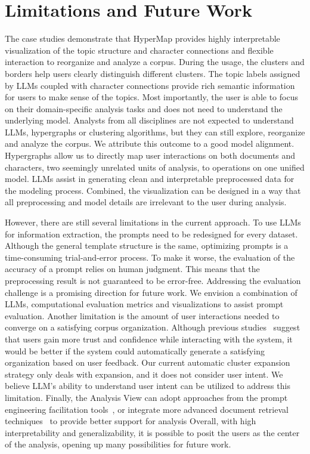 \section{Limitations and Future Work}
The case studies demonstrate that HyperMap provides highly interpretable visualization of the topic structure and character connections and flexible interaction to reorganize and analyze a corpus.
During the usage, the clusters and borders help users clearly distinguish different clusters.
The topic labels assigned by LLMs coupled with character connections provide rich semantic information for users to make sense of the topics.
Most importantly, the user is able to focus on their domain-specific analysis tasks and does not need to understand the underlying model. 
Analysts from all disciplines are not expected to understand LLMs, hypergraphs or clustering algorithms, but they can still explore, reorganize and analyze the corpus. 
We attribute this outcome to a good model alignment. 
Hypergraphs allow us to directly map user interactions on both documents and characters, two seemingly unrelated units of analysis, to operations on one unified model. 
LLMs assist in generating clean and interpretable preprocessed data for the modeling process.
Combined, the visualization can be designed in a way that all preprocessing and model details are irrelevant to the user during analysis.

However, there are still several limitations in the current approach.
To use LLMs for information extraction, the prompts need to be redesigned for every dataset.
Although the general template structure is the same, optimizing prompts is a time-consuming trial-and-error process.
To make it worse, the evaluation of the accuracy of a prompt relies on human judgment.
This means that the preprocessing result is not guaranteed to be error-free.
Addressing the evaluation challenge is a promising direction for future work.
We envision a combination of LLMs, computational evaluation metrics and visualizations to assist prompt evaluation. 
Another limitation is the amount of user interactions needed to converge on a satisfying corpus organization.
Although previous studies~\cite{bach2022systematic} suggest that users gain more trust and confidence while interacting with the system, 
it would be better if the system could automatically generate a satisfying organization based on user feedback.
Our current automatic cluster expansion strategy only deals with expansion, and it does not consider user intent.
We believe LLM's ability to understand user intent can be utilized to address this limitation.
Finally, the Analysis View can adopt approaches from the prompt engineering facilitation tools~\cite{petridis2023promptinfuser, dang2023choice}, or integrate more advanced document retrieval techniques~\cite{qiu2022docflow} to provide better support for analysis
Overall, with high interpretability and generalizability, it is possible to posit the users as the center of the analysis, opening up many possibilities for future work. 